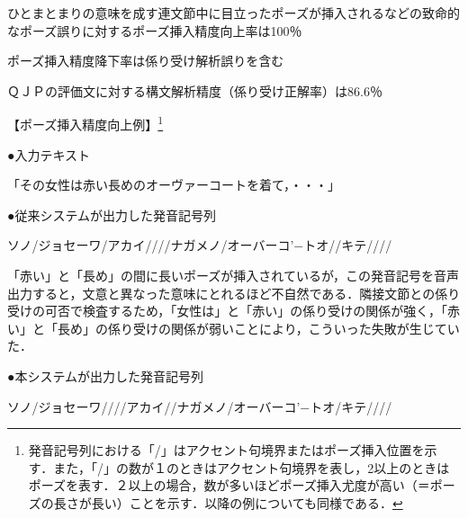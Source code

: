 \begin{itemize} 

{\item \small ひとまとまりの意味を成す連文節中に目立ったポーズが挿入されるなどの致命的なポーズ誤りに対するポーズ挿入精度向上率は100％}

{\item \small ポーズ挿入精度降下率は係り受け解析誤りを含む}

{\item \small ＱＪＰの評価文に対する構文解析精度（係り受け正解率）は86.6％}

\end{itemize}
\vspace{0.3cm}

【ポーズ挿入精度向上例】\footnote{発音記号列における「/」はアクセント句境界またはポーズ挿入位置を示す．また，「/」の数が１のときはアクセント句境界を表し，2以上のときはポーズを表す．２以上の場合，数が多いほどポーズ挿入尤度が高い（＝ポーズの長さが長い）ことを示す．以降の例についても同様である．}

\vspace{0.3cm}

\hspace*{0.5cm}●入力テキスト

\hspace*{1cm}「その女性は赤い長めのオーヴァーコートを着て，・・・」

\vspace{0.3cm}

\hspace*{0.5cm}●従来システムが出力した発音記号列

\hspace*{1.1cm}ソノ/ジョセーワ/アカイ////ナガメノ/オーバーコ’−トオ//キテ////

\vspace{0.4cm}

「赤い」と「長め」の間に長いポーズが挿入されているが，この発音記号を音声出力すると，文意と異なった意味にとれるほど不自然である．隣接文節との係り受けの可否で検査するため，「女性は」と「赤い」の係り受けの関係が強く，「赤い」と「長め」の係り受けの関係が弱いことにより，こういった失敗が生じていた．

\vspace{0.4cm}

\hspace*{0.5cm}●本システムが出力した発音記号列

\hspace*{1.1cm}ソノ/ジョセーワ////アカイ//ナガメノ/オーバーコ’−トオ/キテ////

